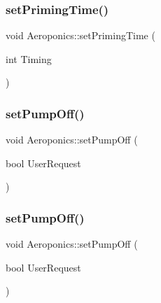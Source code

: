\subsubsection{\texorpdfstring{set\+Priming\+Time()}{setPrimingTime()}\hspace{0.1cm}{\footnotesize\ttfamily [2/2]}}
{\footnotesize\ttfamily void Aeroponics\+::set\+Priming\+Time (\begin{DoxyParamCaption}\item[{int}]{Timing }\end{DoxyParamCaption})\hspace{0.3cm}{\ttfamily [protected]}}

\mbox{\label{class_aeroponics_a24561429d2ee5cf75f86edbe6e0a1d80}} 
\subsubsection{\texorpdfstring{set\+Pump\+Off()}{setPumpOff()}\hspace{0.1cm}{\footnotesize\ttfamily [1/2]}}
{\footnotesize\ttfamily void Aeroponics\+::set\+Pump\+Off (\begin{DoxyParamCaption}\item[{bool}]{User\+Request }\end{DoxyParamCaption})\hspace{0.3cm}{\ttfamily [protected]}}

\mbox{\label{class_aeroponics_a24561429d2ee5cf75f86edbe6e0a1d80}} 
\subsubsection{\texorpdfstring{set\+Pump\+Off()}{setPumpOff()}\hspace{0.1cm}{\footnotesize\ttfamily [2/2]}}
{\footnotesize\ttfamily void Aeroponics\+::set\+Pump\+Off (\begin{DoxyParamCaption}\item[{bool}]{User\+Request }\end{DoxyParamCaption})\hspace{0.3cm}{\ttfamily [protected]}}



